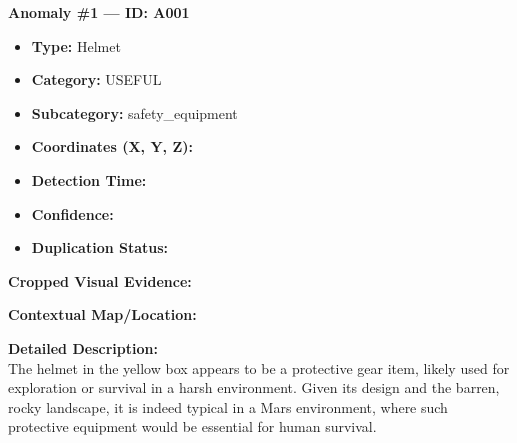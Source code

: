 \documentclass[12pt,a4paper]{report}
\begin{document}
\vspace{2em}
\noindent
\textbf{Anomaly \#1 --- ID: A001 }

\begin{itemize}[leftmargin=1.7cm]
    \item \textbf{Type:} Helmet
    \item \textbf{Category:} USEFUL
    \item \textbf{Subcategory:} safety_equipment
    \item \textbf{Coordinates (X, Y, Z):}  
    \item \textbf{Detection Time:} \underline{\hspace*{3.5cm}}
    \item \textbf{Confidence:} \underline{\hspace*{2.3cm}}
    \item \textbf{Duplication Status:} \underline{\hspace*{3cm}}
\end{itemize}

\vspace{0.7em}
\noindent \textbf{Cropped Visual Evidence:}
\begin{center}
\end{center}

\vspace{1em}
\noindent \textbf{Contextual Map/Location:}
\begin{center}
\end{center}

\vspace{1em}
\noindent \textbf{Detailed Description:} \\
  The helmet in the yellow box appears to be a protective gear item, likely used for exploration or survival in a harsh environment. Given its design and the barren, rocky landscape, it is indeed typical in a Mars environment, where such protective equipment would be essential for human survival.
\end{document}
